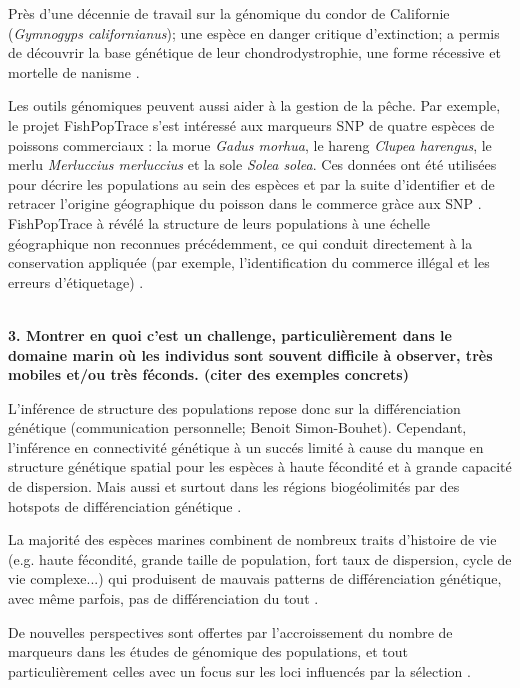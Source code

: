 \documentclass[a4paper,11pt,twoside]{report}
\begin{document}
Près d'une décennie de travail sur la génomique du condor de Californie (\textit{Gymnogyps californianus}); une espèce en danger critique d'extinction; a permis de découvrir la base génétique de leur chondrodystrophie, une forme récessive et mortelle de nanisme \cite{romanov2006construction}.

Les outils génomiques peuvent aussi aider à la gestion de la pêche. Par exemple, le projet FishPopTrace s'est intéressé aux marqueurs SNP de quatre espèces de poissons commerciaux \cite{martinsohn2009fishpoptrace}: la morue \textit{Gadus morhua}, le hareng \textit{Clupea harengus}, le merlu \textit{Merluccius merluccius} et la sole \textit{Solea solea}. Ces données ont été utilisées pour décrire les populations au sein des espèces et par la suite d'identifier et de retracer l'origine géographique du poisson dans le commerce gràce aux SNP \cite{martinsohn2009fishpoptrace}\cite{shafer2015genomics}. FishPopTrace à révélé la structure de leurs populations à une échelle géographique non reconnues précédemment, ce qui conduit directement à la conservation appliquée (par exemple, l'identification du commerce illégal et les erreurs d'étiquetage) \cite{shafer2015genomics}.

~~\\
\textbf{3. Montrer en quoi c'est un challenge, particulièrement dans le domaine marin où les individus sont souvent difficile à observer, très mobiles et/ou très féconds. (citer des exemples concrets)}

L'inférence de structure des populations repose donc sur la différenciation génétique (communication personnelle; Benoit Simon-Bouhet). Cependant, l'inférence en connectivité génétique à un succés limité à cause du manque en structure génétique spatial pour les espèces à haute fécondité et à grande capacité de dispersion. Mais aussi et surtout dans les régions biogéolimités par des hotspots de différenciation génétique \citep{Gagnaire:2015aa}. 

La majorité des espèces marines combinent de nombreux traits d'histoire de vie (e.g. haute fécondité, grande taille de population, fort taux de dispersion, cycle de vie complexe...) qui produisent de mauvais patterns de différenciation génétique, avec même parfois, pas de différenciation du tout\citep{ward1994comparison}\citep{palumbi1994genetic}\citep{hedgecock2007genetic} \citep{Gagnaire:2015aa}.

De nouvelles perspectives sont offertes par l'accroissement du nombre de marqueurs dans les études de génomique des populations, et tout particulièrement celles avec un focus sur les loci influencés par la sélection \cite{Gagnaire:2015aa}.
\end{document}
